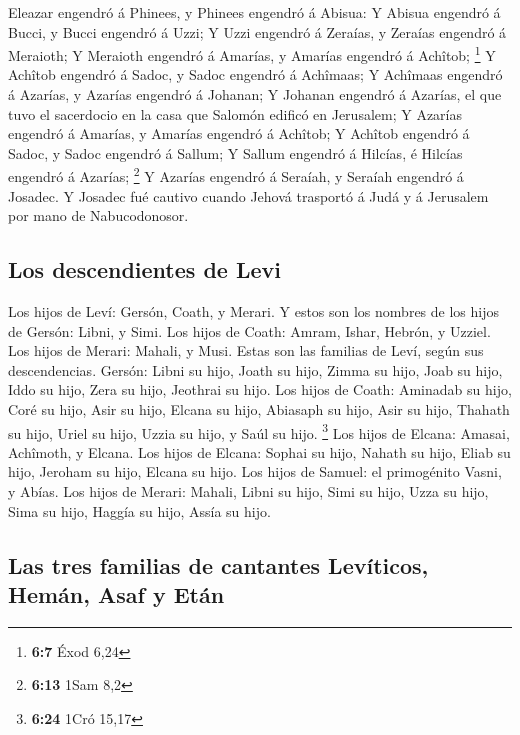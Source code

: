  Eleazar engendró á Phinees, y Phinees engendró á Abisua:
 Y Abisua engendró á Bucci, y Bucci engendró á Uzzi;
 Y Uzzi engendró á Zeraías, y Zeraías engendró á Meraioth;
 Y Meraioth engendró á Amarías, y Amarías engendró á
Achîtob; \footnote{\textbf{6:7} Éxod 6,24}  Y Achîtob
engendró á Sadoc, y Sadoc engendró á Achîmaas;  Y Achîmaas
engendró á Azarías, y Azarías engendró á Johanan;  Y
Johanan engendró á Azarías, el que tuvo el sacerdocio en la casa que
Salomón edificó en Jerusalem;  Y Azarías engendró á
Amarías, y Amarías engendró á Achîtob;  Y Achîtob engendró
á Sadoc, y Sadoc engendró á Sallum;  Y Sallum engendró á
Hilcías, é Hilcías engendró á Azarías; \footnote{\textbf{6:13} 1Sam 8,2}
 Y Azarías engendró á Seraíah, y Seraíah engendró á
Josadec.  Y Josadec fué cautivo cuando Jehová trasportó á
Judá y á Jerusalem por mano de Nabucodonosor.

\hypertarget{los-descendientes-de-levi}{%
\subsection{Los descendientes de Levi}\label{los-descendientes-de-levi}}

 Los hijos de Leví: Gersón, Coath, y Merari. 
Y estos son los nombres de los hijos de Gersón: Libni, y Simi.
 Los hijos de Coath: Amram, Ishar, Hebrón, y Uzziel.
 Los hijos de Merari: Mahali, y Musi. Estas son las
familias de Leví, según sus descendencias.  Gersón: Libni
su hijo, Joath su hijo, Zimma su hijo,  Joab su hijo, Iddo
su hijo, Zera su hijo, Jeothrai su hijo.  Los hijos de
Coath: Aminadab su hijo, Coré su hijo, Asir su hijo, 
Elcana su hijo, Abiasaph su hijo, Asir su hijo,  Thahath su
hijo, Uriel su hijo, Uzzia su hijo, y Saúl su hijo. \footnote{\textbf{6:24}
  1Cró 15,17}  Los hijos de Elcana: Amasai, Achîmoth, y
Elcana.  Los hijos de Elcana: Sophai su hijo, Nahath su
hijo,  Eliab su hijo, Jeroham su hijo, Elcana su hijo.
 Los hijos de Samuel: el primogénito Vasni, y Abías.
 Los hijos de Merari: Mahali, Libni su hijo, Simi su hijo,
Uzza su hijo,  Sima su hijo, Haggía su hijo, Assía su hijo.

\hypertarget{las-tres-familias-de-cantantes-levuxedticos-hemuxe1n-asaf-y-etuxe1n}{%
\subsection{Las tres familias de cantantes Levíticos, Hemán, Asaf y
Etán}\label{las-tres-familias-de-cantantes-levuxedticos-hemuxe1n-asaf-y-etuxe1n}}

